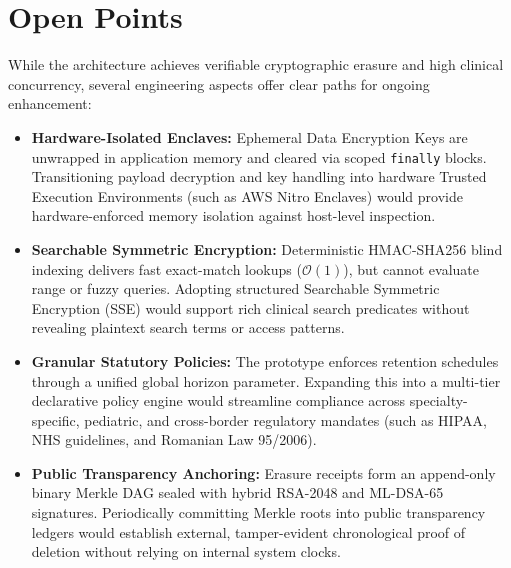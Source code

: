
\section{Open Points}\label{section:open-points}\label{section:limitations-future-work}

While the architecture achieves verifiable cryptographic erasure and high clinical concurrency, several engineering aspects offer clear paths for ongoing enhancement:

\begin{itemize}
    \item \textbf{Hardware-Isolated Enclaves:} Ephemeral Data Encryption Keys are unwrapped in application memory and cleared via scoped \texttt{finally} blocks. Transitioning payload decryption and key handling into hardware Trusted Execution Environments (such as AWS Nitro Enclaves) would provide hardware-enforced memory isolation against host-level inspection.

    \item \textbf{Searchable Symmetric Encryption:} Deterministic HMAC-SHA256 blind indexing delivers fast exact-match lookups ($\mathcal{O}(1)$), but cannot evaluate range or fuzzy queries. Adopting structured Searchable Symmetric Encryption (SSE) would support rich clinical search predicates without revealing plaintext search terms or access patterns.

    \item \textbf{Granular Statutory Policies:} The prototype enforces retention schedules through a unified global horizon parameter. Expanding this into a multi-tier declarative policy engine would streamline compliance across specialty-specific, pediatric, and cross-border regulatory mandates (such as HIPAA, NHS guidelines, and Romanian Law 95/2006).

    \item \textbf{Public Transparency Anchoring:} Erasure receipts form an append-only binary Merkle DAG sealed with hybrid RSA-2048 and ML-DSA-65 signatures. Periodically committing Merkle roots into public transparency ledgers would establish external, tamper-evident chronological proof of deletion without relying on internal system clocks.
\end{itemize}

